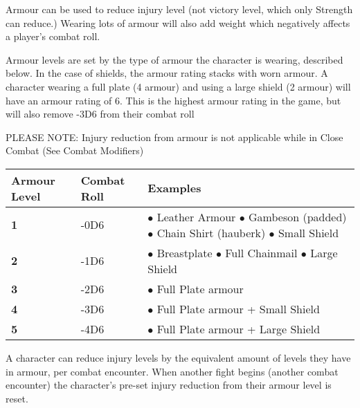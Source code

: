 Armour can be used to reduce injury level (not victory level, which only Strength can reduce.) Wearing lots of armour will also add weight which negatively affects a player’s combat roll.

Armour levels are set by the type of armour the character is wearing, described below. In the case of shields, the armour rating stacks with worn armour. A character wearing a full plate (4 armour) and using a large shield (2 armour) will have an armour rating of 6. This is the highest armour rating in the game, but will also remove -3D6 from their combat roll

PLEASE NOTE: Injury reduction from armour is not applicable while in Close Combat (See Combat Modifiers) %

\begin{center}
    \begin{xltabular}{\textwidth}{|l l X|} 
        \hline 
        \textbf{Armour Level} & \textbf{Combat Roll} & \textbf{Examples} \\ 
        \hline
        \textbf{1} & -0D6 & 
        $\bullet$ Leather Armour \newline %
        $\bullet$ Gambeson (padded) \newline 
        $\bullet$ Chain Shirt (hauberk) \newline 
        $\bullet$ Small Shield \vspace{1em} \\
        \textbf{2} & -1D6 & 
        $\bullet$ Breastplate \newline 
        $\bullet$ Full Chainmail \newline 
        $\bullet$ Large Shield \vspace{1em} \\
        \textbf{3} & -2D6 & 
        $\bullet$ Full Plate armour \vspace{1em} \\
        \textbf{4} & -3D6 & 
        $\bullet$ Full Plate armour + Small Shield \vspace{1em} \\
        \textbf{5} & -4D6 & 
        $\bullet$ Full Plate armour + Large Shield \vspace{1em} \\
        \hline
    \end{xltabular}
\end{center}

A character can reduce injury levels by the equivalent amount of levels they have in armour, per combat encounter. When another fight begins (another combat encounter) the character’s pre-set injury reduction from their armour level is reset.

